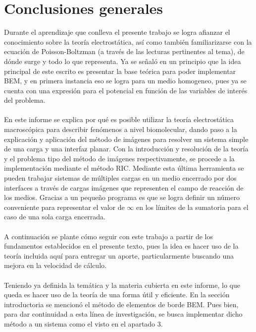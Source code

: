 \documentclass[12pt, notitlepage]{article}
\begin{document}


\section{Conclusiones generales}
Durante el aprendizaje que conlleva el presente trabajo se logra afianzar el conocimiento sobre la teoría electrostática, así como también familiarizarse con la ecuación de Poisson-Boltzman (a través de las lecturas pertinentes al tema), de dónde surge y todo lo que representa. Ya se señaló en un principio que la idea principal de este escrito es presentar la base teórica para poder implementar BEM, y en primera instancia eso se logra para un medio homogeneo, pues ya se cuenta con una expresión para el potencial en función de las variables de interés del problema.\\\\
En este informe se explica por qué es posible utilizar la teoría electrostática macroscópica para describir fenómenos a nivel biomolecular, dando paso a la explicación y aplicación del método de imágenes para resolver un sistema simple de una carga y una interfaz planar. Con la introducción y resolución de la teoría y el problema tipo del método de imágenes respectivamente, se procede a la implementación mediante el método RIC. Mediante esta última herramienta se pueden trabajar sistemas de múltiples cargas en un medio encerrado por dos interfaces a través de cargas imágenes que representen el campo de reacción de los medios. Gracias a un pequeño programa es que se logra definir un número conveniente para representar el valor de $\infty$ en los límites de la sumatoria para el caso de una sola carga encerrada. \\\\
A continuación se plante cómo seguir con este trabajo a partir de los fundamentos establecidos en el presente texto, pues la idea es hacer uso de la teoría incluida aquí para entregar un aporte, particularmente buscando una mejora en la velocidad de cálculo.\\\\
Teniendo ya definida la temática y la materia cubierta en este informe, lo que queda es hacer uso de la teoría de una forma útil y eficiente. En la sección introductoria se mencionó el método de elementos de borde BEM. Pues bien, para dar continuidad a esta línea de investigación, se busca implementar dicho método a un sistema como el visto en el apartado 3.\\\\
\end{document}
